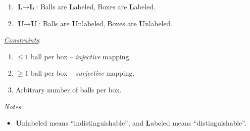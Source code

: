 \documentclass[a4paper,12pt]{article}
\begin{document}
\begin{tasks}
\begin{enumerate}[label=\alph*., itemsep=4pt]
        \resetBoxes
        \resetBalls
        \renewcommand{\theballs}{\arabic{balls}}
        \renewcommand{\theboxes}{}
        \drawBoxWithOneBall
        \drawBoxWithTwoBalls
        \drawBoxWithoutBalls
        \drawBoxWithFourBalls
        \drawBoxWithThreeBalls

        \item $\textbf{L} \to \textbf{L}$: Balls are \textbf{L}abeled, Boxes are \textbf{L}abeled.

        \resetBoxes
        \resetBalls
        \renewcommand{\theballs}{\arabic{balls}}
        \renewcommand{\theboxes}{\Alph{boxes}}
        \drawBoxWithTwoBalls
        \drawBoxWithOneBall
        \drawBoxWithThreeBalls
        \drawBoxWithoutBalls
        \drawBoxWithFourBalls

        \item $\textbf{U} \to \textbf{U}$: Balls are \textbf{U}nlabeled, Boxes are \textbf{U}nlabeled.

        \resetBoxes
        \resetBalls
        \renewcommand{\theballs}{}
        \renewcommand{\theboxes}{}
        \drawBoxWithFourBalls
        \drawBoxWithThreeBalls
        \drawBoxWithTwoBalls
        \drawBoxWithOneBall
        \drawBoxWithoutBalls
    \end{enumerate}

    \vspace{2pt}
    \textit{\uline{Constraints}}:

    \begin{enumerate}[label=\arabic*., noitemsep]
        \item $\leq 1$ ball per box \--- \emph{injective} mapping.
        \item $\geq 1$ ball per box \--- \emph{surjective} mapping.
        \item Arbitrary number of balls per box.
    \end{enumerate}

    \textit{\uline{Notes}}:

    \begin{itemize}[label=$\ast$, noitemsep]
        \item \textbf{U}nlabeled means \enquote{indistinguishable}, and \textbf{L}abeled means \enquote{distinguishable}.


\end{itemize}
\end{tasks}
\end{document}
